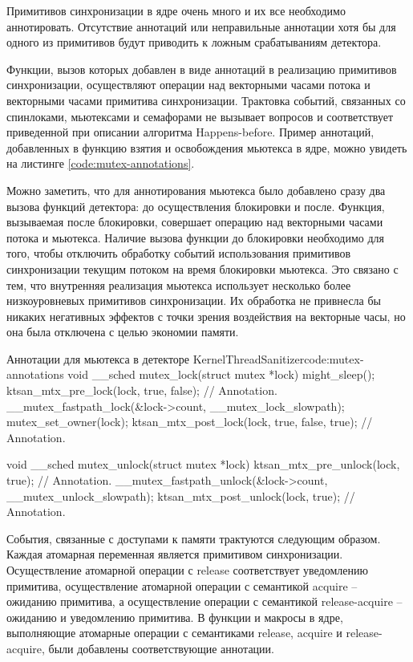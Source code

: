 Примитивов синхронизации в ядре очень много и их все необходимо аннотировать.
Отсутствие аннотаций или неправильные аннотации хотя бы для одного из примитивов будут приводить к ложным срабатываниям детектора.

Функции, вызов которых добавлен в виде аннотаций в реализацию примитивов синхронизации, осуществляют операции над векторными часами потока и векторными часами примитива синхронизации.
Трактовка событий, связанных со спинлоками, мьютексами и семафорами не вызывает вопросов и соответствует приведенной при описании алгоритма Happens-before.
Пример аннотаций, добавленных в функцию взятия и освобождения мьютекса в ядре, можно увидеть на листинге \ref{code:mutex-annotations}.

Можно заметить, что для аннотирования мьютекса было добавлено сразу два вызова функций детектора: до осуществления блокировки и после.
Функция, вызываемая после блокировки, совершает операцию над векторными часами потока и мьютекса.
Наличие вызова функции до блокировки необходимо для того, чтобы отключить обработку событий использования примитивов синхронизации текущим потоком на время блокировки мьютекса.
Это связано с тем, что внутренняя реализация мьютекса использует несколько более низкоуровневых примитивов синхронизации.
Их обработка не привнесла бы никаких негативных эффектов с точки зрения воздействия на векторные часы, но она была отключена с целью экономии памяти.

\begin{listing}{Аннотации для мьютекса в детекторе KernelThreadSanitizer}{code:mutex-annotations}
void __sched mutex_lock(struct mutex *lock)
{
  might_sleep();
  ktsan_mtx_pre_lock(lock, true, false); // Annotation.
  __mutex_fastpath_lock(&lock->count, __mutex_lock_slowpath);
  mutex_set_owner(lock);
  ktsan_mtx_post_lock(lock, true, false, true); // Annotation.
}

void __sched mutex_unlock(struct mutex *lock)
{
  ktsan_mtx_pre_unlock(lock, true); // Annotation.
  __mutex_fastpath_unlock(&lock->count, __mutex_unlock_slowpath);
  ktsan_mtx_post_unlock(lock, true); // Annotation.
}
\end{listing}

События, связанные с  доступами к памяти трактуются следующим образом.
Каждая атомарная переменная является примитивом синхронизации.
Осуществление атомарной операции с  release соответствует уведомлению примитива, осуществление атомарной операции с семантикой acquire -- ожиданию примитива, а осуществление операции с семантикой release-acquire -- ожиданию и уведомлению примитива.
В функции и макросы в ядре, выполняющие атомарные операции с семантиками release, acquire и release-acquire, были добавлены соответствующие аннотации.

